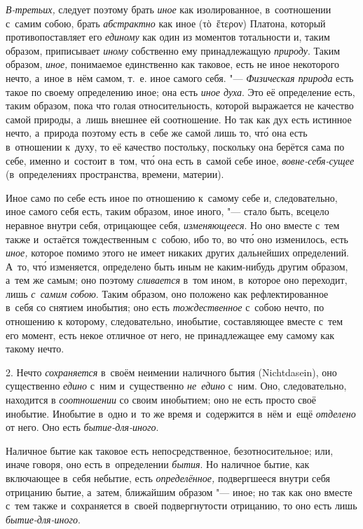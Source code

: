 {\em В-третьих,} следует поэтому брать {\em иное} как изолированное,
в~соотношении с~самим собою, брать {\em абстрактно}
как иное (\textgreek{τὸ~ἕτερον}) Платона, который
противопоставляет его {\em единому} как один из
моментов тотальности и, таким образом, приписывает
{\em иному} собственно ему принадлежащую {\em природу}. Таким образом,
{\em иное,} понимаемое единственно как таковое, есть
не иное некоторого нечто, а~иное в~нём самом, т.~е. иное самого себя.
"--- {\em Физическая природа} есть такое по своему
определению иное; она есть {\em иное духа}. Это её
определение есть, таким образом, пока что голая относительность, которой
выражается не качество самой природы, а~лишь внешнее ей соотношение. Но так
как дух есть истинное нечто, а~природа поэтому есть в~себе же самой лишь
то, чт\'{о} она есть в~отношении к~духу, то её качество постольку, поскольку
она берётся сама по себе, именно и~состоит в~том, чт\'{о} она есть в~самой себе
иное, {\em вовне-себя-сущее} (в~определениях пространства, времени, материи).

Иное само по себе есть иное по отношению к~самому себе и, следовательно, иное самого
себя есть, таким образом, иное иного, "--- стало быть, всецело неравное
внутри себя, отрицающее себя, {\em изменяющееся}. Но
оно вместе с~тем также и~остаётся тождественным с~собою, ибо то, во чт\'{о} оно
изменилось, есть {\em иное,} которое помимо этого не
имеет никаких других дальнейших определений. А~то, чт\'{о} изменяется,
определено быть иным не каким-нибудь другим образом, а~тем же самым; оно
поэтому {\em сливается} в~том ином, в~которое оно
переходит, лишь {\em с~самим собою}. Таким образом, оно
положено как рефлектированное в~себя со снятием инобытия; оно есть
{\em тождественное} с~собою нечто, по отношению к
которому, следовательно, инобытие, составляющее вместе с~тем его момент,
есть некое отличное от него, не принадлежащее ему самому как такому нечто.

2. Нечто {\em сохраняется} в~своём неимении наличного
бытия (Nicht\-dasein), оно существенно {\em едино} с~ним
и~существенно {\em не~едино} с~ним. Оно, следовательно,
находится в {\em соотношении} со своим инобытием; оно не есть просто
своё инобытие. Инобытие в~одно и~то же время и~содержится в~нём
и~ещё {\em отделено} от него. Оно есть {\em бытие-для-иного}.

Наличное бытие как таковое есть непосредственное, безотносительное; или,
иначе говоря, оно есть в~определении {\em бытия}. Но
наличное бытие, как включающее в~себя небытие, есть
{\em определённое,} подвергшееся внутри себя отрицанию
бытие, а~затем, ближайшим образом "--- иное; но так как оно вместе с~тем
также и~сохраняется в~своей подвергнутости отрицанию, то оно есть лишь
{\em бытие-для-иного}.


